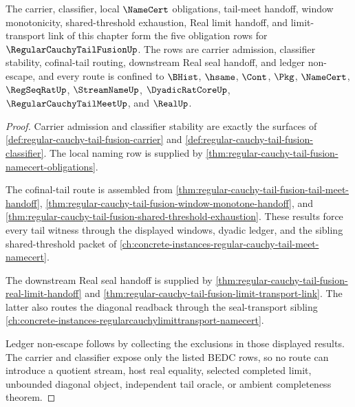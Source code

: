 \begin{theorem}
\label{thm:regular-cauchy-tail-fusion-obligation-surface}
The carrier, classifier, local $\NameCert$ obligations, tail-meet handoff, window monotonicity, shared-threshold exhaustion, Real limit handoff, and limit-transport link of this chapter form the five obligation rows for $\RegularCauchyTailFusionUp$. The rows are carrier admission, classifier stability, cofinal-tail routing, downstream Real seal handoff, and ledger non-escape, and every route is confined to $\BHist$, $\hsame$, $\Cont$, $\Pkg$, $\NameCert$, $\RegSeqRatUp$, $\StreamNameUp$, $\DyadicRatCoreUp$, $\RegularCauchyTailMeetUp$, and $\RealUp$.
\end{theorem}
\begin{proof}
Carrier admission and classifier stability are exactly the surfaces of \autoref{def:regular-cauchy-tail-fusion-carrier} and \autoref{def:regular-cauchy-tail-fusion-classifier}. The local naming row is supplied by \autoref{thm:regular-cauchy-tail-fusion-namecert-obligations}.

The cofinal-tail route is assembled from \autoref{thm:regular-cauchy-tail-fusion-tail-meet-handoff}, \autoref{thm:regular-cauchy-tail-fusion-window-monotone-handoff}, and \autoref{thm:regular-cauchy-tail-fusion-shared-threshold-exhaustion}. These results force every tail witness through the displayed windows, dyadic ledger, and the sibling shared-threshold packet of \autoref{ch:concrete-instances-regular-cauchy-tail-meet-namecert}.

The downstream Real seal handoff is supplied by \autoref{thm:regular-cauchy-tail-fusion-real-limit-handoff} and \autoref{thm:regular-cauchy-tail-fusion-limit-transport-link}. The latter also routes the diagonal readback through the seal-transport sibling \autoref{ch:concrete-instances-regularcauchylimittransport-namecert}.

Ledger non-escape follows by collecting the exclusions in those displayed results. The carrier and classifier expose only the listed BEDC rows, so no route can introduce a quotient stream, host real equality, selected completed limit, unbounded diagonal object, independent tail oracle, or ambient completeness theorem.
\end{proof}


